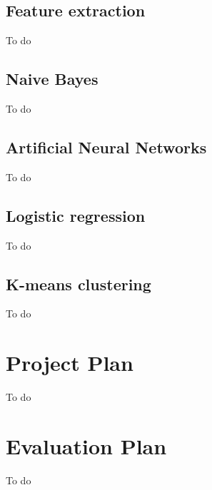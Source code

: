 \documentclass[12pt]{article}
\begin{document}
\subsection{Feature extraction}
To do

\subsection{Naive Bayes}
To do

\subsection{Artificial Neural Networks}
To do

\subsection{Logistic regression}
To do

\subsection{K-means clustering}
To do

\newpage

\section{Project Plan}
To do


\newpage

\section{Evaluation Plan}
To do
\end{document}
